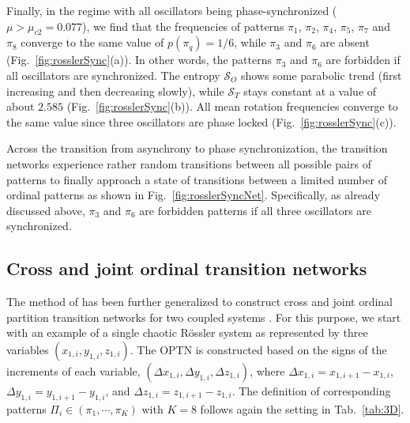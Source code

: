 Finally, in the regime with all oscillators being phase-synchronized ($\mu > \mu_{c2} = 0.077$), we find that the frequencies of patterns $\pi_1$, $\pi_2$, $\pi_4$, $\pi_5$, $\pi_7$ and $\pi_8$ converge to the same value of $p(\pi_q) = 1/6$, while $\pi_3$ and $\pi_6$ are absent (Fig.~\ref{fig:rosslerSync}(a)). In other words, the patterns $\pi_3$ and $\pi_6$ are forbidden if all oscillators are synchronized. The entropy $\mathcal{S}_O$ shows some parabolic trend (first increasing and then decreasing slowly), while $\mathcal{S}_T$ stays constant at a value of about $2.585$ (Fig.~\ref{fig:rosslerSync}(b)). All mean rotation frequencies converge to the same value since three oscillators are phase locked (Fig.~\ref{fig:rosslerSync}(c)).

Across the transition from asynchrony to phase synchronization, the transition networks experience rather random transitions between all possible pairs of patterns to finally approach a state of transitions between a limited number of ordinal patterns as shown in Fig.~\ref{fig:rosslerSyncNet}. Specifically, as already discussed above, $\pi_3$ and $\pi_6$ are forbidden patterns if all three oscillators are synchronized.

		\subsection{Cross and joint ordinal transition networks} 
		The method of \cite{Zhang2017b} has been further generalized to construct cross and joint ordinal partition transition networks for two coupled systems \cite{Guo2018}. For this purpose, we start with an example of a single chaotic R\"ossler system as represented by three variables $(x_{1,i}, y_{1,i}, z_{1,i})$. The OPTN is constructed based on the signs of the increments of each variable, $(\Delta x_{1,i}, \Delta y_{1,i}, \Delta z_{1,i})$, where $\Delta x_{1,i} = x_{1,i+1} - x_{1,i}$, $\Delta y_{1,i} = y_{1,i+1} - y_{1,i}$, and $\Delta z_{1,i} = z_{1,i+1} - z_{1,i}$. The definition of corresponding patterns $\Pi_i \in (\pi_1, \cdots, \pi_K)$ with $K=8$ follows again the setting in Tab.~\ref{tab:3D}. 
        
